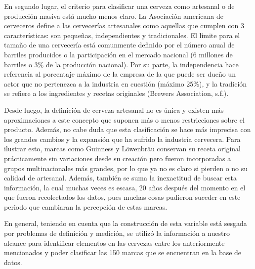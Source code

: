 \documentclass[
]{article}
\begin{document}
En segundo lugar, el criterio para clasificar una cerveza como artesanal
o de producción masiva está mucho menos claro. La Asociación americana
de cerveceros define a las cervecerías artesanales como aquellas que
cumplen con 3 características: son pequeñas, independientes y
tradicionales. El límite para el tamaño de una cervecería está
comunmente definido por el número anual de barriles producidos o la
participación en el mercado nacional (6 millones de barriles o 3\% de la
producción nacional). Por su parte, la independencia hace referencia al
porcentaje máximo de la empresa de la que puede ser dueño un actor que
no pertenezca a la industria en cuestión (máximo 25\%), y la tradición
se refiere a los ingredientes y recetas originales (Brewers Association,
s.f.).

Desde luego, la definición de cerveza artesanal no es única y existen
más aproximaciones a este concepto que suponen más o menos restricciones
sobre el producto. Además, no cabe duda que esta clasificación se hace
más imprecisa con los grandes cambios y la expansión que ha sufrido la
industria cervecera. Para ilustrar esto, marcas como Guinness y
Löwenbräu conservan su receta original prácticamente sin variaciones
desde su creación pero fueron incorporadas a grupos multinacionales más
grandes, por lo que ya no es claro si pierden o no su calidad de
artesanal. Además, también se suma la inexactitud de buscar esta
información, la cual muchas veces es escasa, 20 años después del momento
en el que fueron recolectados los datos, pues muchas cosas pudieron
suceder en este periodo que cambiaran la percepción de estas marcas.

En general, teniendo en cuenta que la construcción de esta variable está
sesgada por problemas de definición y medición, se utilizó la
información a nuestro alcance para identificar elementos en las cervezas
entre los anteriormente mencionados y poder clasificar las 150 marcas
que se encuentran en la base de datos.
\end{document}
